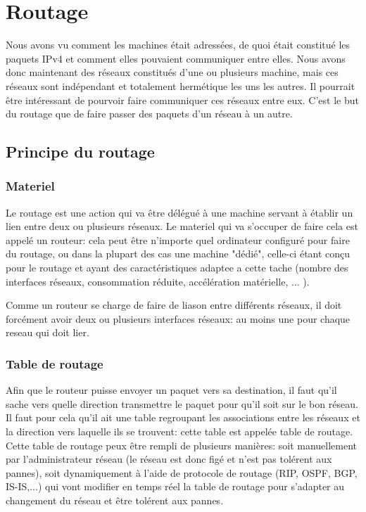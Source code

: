 \section{Routage}

Nous avons vu comment les machines était adressées, de quoi était constitué les
paquets IPv4 et comment elles pouvaient communiquer entre elles.  Nous avons
donc maintenant des réseaux constitués d'une ou plusieurs machine, mais ces
réseaux sont indépendant et totalement hermétique les uns les autres. Il
pourrait être intéressant de pourvoir faire communiquer ces réseaux entre eux.
C'est le but du routage que de faire passer des paquets d'un réseau à un autre.

\subsection{Principe du routage}

\subsubsection{Materiel}
Le routage est une action qui va être délégué à une machine servant à établir
un lien entre deux ou plusieurs réseaux.  Le materiel qui va s'occuper de faire
cela est appelé un routeur: cela peut être n'importe quel ordinateur configuré
pour faire du routage, ou dans la plupart des cas une machine "dédié", celle-ci
étant conçu pour le routage et ayant des caractéristiques adaptee a cette tache
(nombre des interfaces réseaux, consommation réduite, accélération matérielle, ... ).

Comme un routeur se charge de faire de liason entre différents réseaux, il doit
forcément avoir deux ou plusieurs interfaces réseaux: au moins une pour chaque
reseau qui doit lier.

\subsubsection{Table de routage}
Afin que le routeur puisse envoyer un paquet vers sa destination, il faut qu'il
sache vers quelle direction transmettre le paquet pour qu'il soit sur le bon
réseau. Il faut pour cela qu'il ait une table regroupant les associations entre
les réseaux et la direction vers laquelle ils se trouvent: cette table est
appelée table de routage.  Cette table de routage peux être rempli de plusieurs
manières: soit manuellement par l'administrateur réseau (le réseau est donc
figé et n'est pas tolérent aux pannes), soit dynamiquement à l'aide de
protocole de routage (RIP, OSPF, BGP, IS-IS,...) qui vont modifier en temps
réel la table de routage pour s'adapter au changement du réseau et être
tolérent aux pannes.

